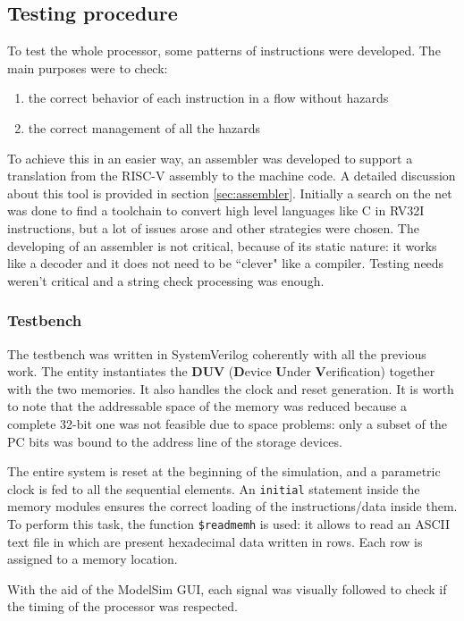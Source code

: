 \documentclass[a4paper]{article}
\begin{document}
\subsection{Testing procedure}\label{sec:main}
To test the whole processor, some patterns of instructions were developed. The main purposes were to check:
\begin{enumerate}
\item the correct behavior of each instruction in a flow without hazards
\item the correct management of all the hazards
\end{enumerate}
To achieve this in an easier way, an assembler was developed to support a translation from the RISC-V assembly to the machine code. A detailed discussion about this tool is provided in section \ref{sec:assembler}. Initially a search on the net was done to find a toolchain to convert high level languages like C in RV32I instructions, but a lot of issues arose and other strategies were chosen. The developing of an assembler is not critical, because of its static nature: it works like a decoder and it does not need to be ``clever" like a compiler. Testing needs weren't critical and a string check processing was enough.

\subsubsection{Testbench} The testbench was written in SystemVerilog coherently with all the previous work. The entity instantiates the \textbf{DUV} (\textbf{D}evice \textbf{U}nder \textbf{V}erification) together with the two memories. It also handles the clock and reset generation.
It is worth to note that the addressable space of the memory was reduced because a complete 32-bit one was not feasible due to space problems: only a subset of the PC bits was bound to the address line of the storage devices.

The entire system is reset at the beginning of the simulation, and a parametric clock is fed to all the sequential elements.
An \texttt{initial} statement inside the memory modules ensures the correct loading of the instructions/data inside them. To perform this task, the function \texttt{\$readmemh} is used: it allows to read an ASCII text file in which are present hexadecimal data written in rows. Each row is assigned to a memory location.

With the aid of the ModelSim GUI, each signal was visually followed to check if the timing of the processor was respected. 
\end{document}
